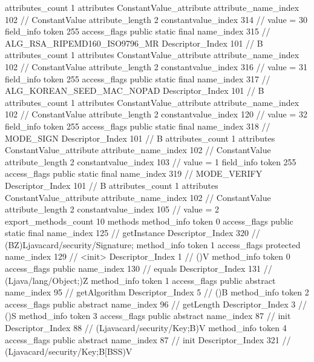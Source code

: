 {{{{{				attributes_count	1
				attributes {
				ConstantValue_attribute {
					attribute_name_index	102		// ConstantValue
					attribute_length	2
					constantvalue_index	314		// value = 30
				}
				}
			}
			field_info {
				token	255
				access_flags	public static final
				name_index	315		// ALG_RSA_RIPEMD160_ISO9796_MR
				Descriptor_Index	101		// B
				attributes_count	1
				attributes {
				ConstantValue_attribute {
					attribute_name_index	102		// ConstantValue
					attribute_length	2
					constantvalue_index	316		// value = 31
				}
				}
			}
			field_info {
				token	255
				access_flags	public static final
				name_index	317		// ALG_KOREAN_SEED_MAC_NOPAD
				Descriptor_Index	101		// B
				attributes_count	1
				attributes {
				ConstantValue_attribute {
					attribute_name_index	102		// ConstantValue
					attribute_length	2
					constantvalue_index	120		// value = 32
				}
				}
			}
			field_info {
				token	255
				access_flags	public static final
				name_index	318		// MODE_SIGN
				Descriptor_Index	101		// B
				attributes_count	1
				attributes {
				ConstantValue_attribute {
					attribute_name_index	102		// ConstantValue
					attribute_length	2
					constantvalue_index	103		// value = 1
				}
				}
			}
			field_info {
				token	255
				access_flags	public static final
				name_index	319		// MODE_VERIFY
				Descriptor_Index	101		// B
				attributes_count	1
				attributes {
				ConstantValue_attribute {
					attribute_name_index	102		// ConstantValue
					attribute_length	2
					constantvalue_index	105		// value = 2
				}
				}
			}
			}
			export_methods_count	10
			methods {
				method_info {
					token	0
					access_flags	public static final
					name_index	125		// getInstance
					Descriptor_Index	320		// (BZ)Ljavacard/security/Signature;
				}
				method_info {
					token	1
					access_flags	protected
					name_index	129		// <init>
					Descriptor_Index	1		// ()V
				}
				method_info {
					token	0
					access_flags	public
					name_index	130		// equals
					Descriptor_Index	131		// (Ljava/lang/Object;)Z
				}
				method_info {
					token	1
					access_flags	public abstract
					name_index	95		// getAlgorithm
					Descriptor_Index	5		// ()B
				}
				method_info {
					token	2
					access_flags	public abstract
					name_index	96		// getLength
					Descriptor_Index	3		// ()S
				}
				method_info {
					token	3
					access_flags	public abstract
					name_index	87		// init
					Descriptor_Index	88		// (Ljavacard/security/Key;B)V
				}
				method_info {
					token	4
					access_flags	public abstract
					name_index	87		// init
					Descriptor_Index	321		// (Ljavacard/security/Key;B[BSS)V
}}}}}
